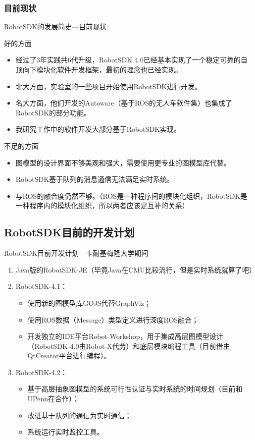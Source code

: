 \documentclass[9pt]{beamer}
\begin{document}
	\subsubsection{目前现状}
	\begin{frame}{RobotSDK的发展简史---目前现状}
		\begin{block}{好的方面}
			\begin{itemize}
				\item 经过了3年实践共6代升级，RobotSDK 4.0已经基本实现了一个稳定可靠的自顶向下模块化软件开发框架，最初的理念也已经实现。
				\item 北大方面，实验室的一些项目开始使用RobotSDK进行开发。
				\item 名大方面，他们开发的Autoware（基于ROS的无人车软件集）也集成了RobotSDK的部分功能。
				\item 我研究工作中的软件开发大部分基于RobotSDK实现。
			\end{itemize}
		\end{block}
		\begin{block}{不足的方面}
			\begin{itemize}
				\item 图模型的设计界面不够美观和强大，需要使用更专业的图模型库代替。
				\item RobotSDK基于队列的消息通信无法满足实时系统。
				\item 与ROS的融合度仍然不够。（ROS是一种程序间的模块化组织，RobotSDK是一种程序内的模块化组织，所以两者应该是互补的关系）
			\end{itemize}
		\end{block}
	\end{frame}
	
	\subsection{RobotSDK目前的开发计划}
	\begin{frame}{RobotSDK目前开发计划---卡耐基梅隆大学期间}
		\begin{enumerate}
			\item Java版的RobotSDK-JE（毕竟Java在CMU比较流行，但是实时系统就算了吧）
			\item RobotSDK-4.1： 
			\begin{itemize}
				\item 使用新的图模型库GOJS代替GraphViz；
				\item 使用ROS数据（Message）类型定义进行深度ROS融合；
				\item 开发独立的IDE平台Robot-Workshop，用于集成高层图模型设计（RobotSDK-4.0由Robot-X代劳）和底层模块编程工具（目前借由QtCreator平台进行编程）。
			\end{itemize}
			\item RobotSDK-4.2： 
			\begin{itemize}
				\item 基于高层抽象图模型的系统可行性认证与实时系统的时间规划（目前和UPenn在合作）；
				\item 改进基于队列的通信为实时通信；
				\item 系统运行实时监控工具。
			\end{itemize}
		\end{enumerate}
	\end{frame}
	
\end{document}
